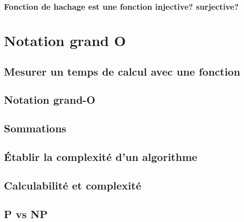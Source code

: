 \documentclass[
  letterpaper,
]{scrbook}
\theoremstyle{definition}
\theoremstyle{definition}
\theoremstyle{remark}
\begin{document}
\hypertarget{fonction-de-hachage-est-une-fonction-injective-surjective}{%
\subsection{Fonction de hachage est une fonction injective?
surjective?}\label{fonction-de-hachage-est-une-fonction-injective-surjective}}


\hypertarget{notation-grand-o}{%
\chapter{Notation grand O}\label{notation-grand-o}}

\hypertarget{mesurer-un-temps-de-calcul-avec-une-fonction}{%
\section{Mesurer un temps de calcul avec une
fonction}\label{mesurer-un-temps-de-calcul-avec-une-fonction}}

\hypertarget{notation-grand-o-1}{%
\section{Notation grand-O}\label{notation-grand-o-1}}

\hypertarget{sommations}{%
\section{Sommations}\label{sommations}}

\hypertarget{uxe9tablir-la-complexituxe9-dun-algorithme}{%
\section{Établir la complexité d'un
algorithme}\label{uxe9tablir-la-complexituxe9-dun-algorithme}}

\hypertarget{calculabilituxe9-et-complexituxe9}{%
\section{Calculabilité et
complexité}\label{calculabilituxe9-et-complexituxe9}}

\hypertarget{p-vs-np}{%
\section{P vs NP}\label{p-vs-np}}
\end{document}
